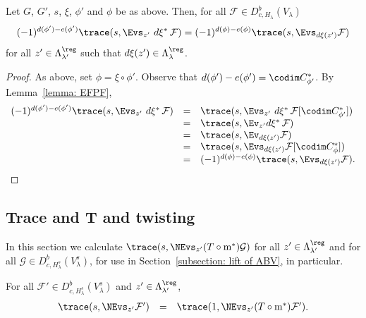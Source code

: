 \documentclass[11pt,letterpaper]{amsart}
\newcommand{\calm}{\textrm{m}}
\numberwithin{equation}{section}
\begin{document}
\begin{lemma}\label{lemma: Evs FPF}
    Let $G$, $G'$, $s$, $\xi$, $\phi'$ and $\phi$ be as above.
    Then, for all $\mathcal{F}\in D^b_{c,H_\lambda}(V_\lambda)$
\[
(-1)^{d(\phi')-e(\phi')} \trace(s,\Evs_{z'}\ d\xi^*\, \mathcal{F})
=
(-1)^{d(\phi)-e(\phi)}
\trace({s},\Evs_{d\xi(z')} \mathcal{F})
\] 
for all $z'\in \Lambda^\reg_{\lambda'}$ such that $d\xi(z')\in \Lambda^\reg_{\lambda}$.
\end{lemma}

\begin{proof}
As above, set $\phi = \xi\circ\phi'$.
Observe that $d(\phi') - e(\phi') = \codim C^*_{\phi'}$.
By Lemma~\ref{lemma: EFPF},
\[
\begin{array}{rcl}
(-1)^{d(\phi')-e(\phi')} \trace(s,\Evs_{z'}\ d\xi^*\, \mathcal{F})
&=&
\trace(s,\Evs_{z'}\ d\xi^*\, \mathcal{F}[\codim C^*_{\phi'}])\\
&=&
\trace(s,\Ev_{z'} d\xi^*\, \mathcal{F})\\
&=&
\trace(s,\Ev_{d\xi(z')} \mathcal{F})\\
&=&
\trace(s,\Evs_{d\xi(z')}\mathcal{F}[\codim C^*_{\phi}])\\
&=&
(-1)^{d(\phi)-e(\phi)}
\trace(s,\Evs_{d\xi(z')}\mathcal{F}).
\end{array}
\]   
\end{proof}



\subsection{Trace and T and twisting}\label{subsection: trace of sigma}

In this section we calculate $\trace(s,\NEvs_{z'}(T\circ\calm^*)\mathcal{G})$ for all $z'\in \Lambda^\reg_{\lambda'}$ and for all $\mathcal{G}\in D^b_{c,H_\lambda^s}(V_\lambda^s)$, for use in Section~\ref{subsection: lift of ABV}, in particular.




\begin{proposition}\label{proposition: T}
For all $\mathcal{F'}\in D^b_{c,H_\lambda^s}(V_\lambda^s)$ and $z'\in \Lambda_{\lambda'}^\reg$,
\[
\begin{array}{rcl}
\trace(s,\NEvs_{z'}  \mathcal{F'})
&=& 
\trace(1,\NEvs_{z'}(T\circ\calm^*)\mathcal{F'}).
\end{array}
\]
\end{proposition}
\end{document}

